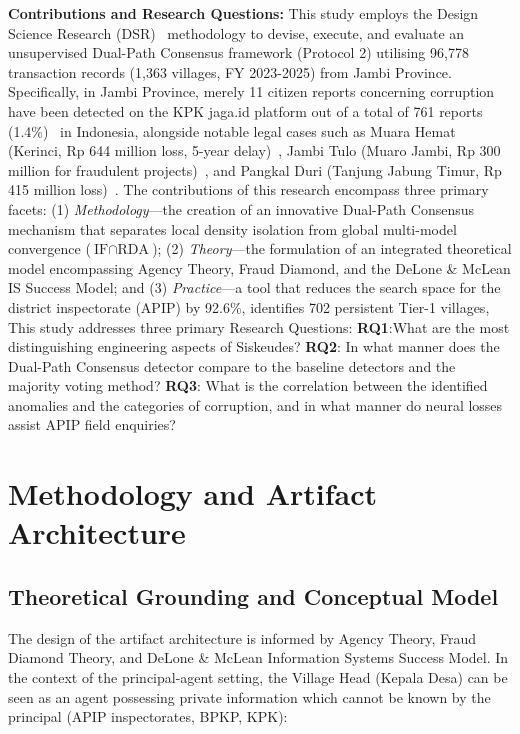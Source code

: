 \documentclass[conference]{IEEEtran}
\begin{document}
\textbf{Contributions and Research Questions:} This study employs the Design Science Research (DSR)~\cite{ref10} methodology to devise, execute, and evaluate an unsupervised Dual-Path Consensus framework (Protocol 2) utilising 96,778 transaction records (1,363 villages, FY 2023-2025) from Jambi Province. Specifically, in Jambi Province, merely 11 citizen reports concerning corruption have been detected on the KPK jaga.id platform out of a total of 761 reports (1.4\%)~\cite{ref26} in Indonesia, alongside notable legal cases such as Muara Hemat (Kerinci, Rp 644 million loss, 5-year delay)~\cite{ref28,ref30}, Jambi Tulo (Muaro Jambi, Rp 300 million for fraudulent projects)~\cite{ref29}, and Pangkal Duri (Tanjung Jabung Timur, Rp 415 million loss)~\cite{ref31}. The contributions of this research encompass three primary facets: (1) \textit{Methodology}—the creation of an innovative Dual-Path Consensus mechanism that separates local density isolation from global multi-model convergence ($\text{IF} \cap \text{RDA}$); (2) \textit{Theory}—the formulation of an integrated theoretical model encompassing Agency Theory, Fraud Diamond, and the DeLone \& McLean IS Success Model; and (3) \textit{Practice}—a tool that reduces the search space for the district inspectorate (APIP) by 92.6\%, identifies 702 persistent Tier-1 villages, This study addresses three primary Research Questions: \textbf{RQ1}:What are the most distinguishing engineering aspects of Siskeudes? \textbf{RQ2}: In what manner does the Dual-Path Consensus detector compare to the baseline detectors and the majority voting method? \textbf{RQ3}: What is the correlation between the identified anomalies and the categories of corruption, and in what manner do neural losses assist APIP field enquiries?

\section{Methodology and Artifact Architecture}

\subsection{Theoretical Grounding and Conceptual Model}

The design of the artifact architecture is informed by Agency Theory, Fraud Diamond Theory, and DeLone \& McLean Information Systems Success Model. In the context of the principal-agent setting, the Village Head (Kepala Desa) can be seen as an agent possessing private information which cannot be known by the principal (APIP inspectorates, BPKP, KPK):
\end{document}
